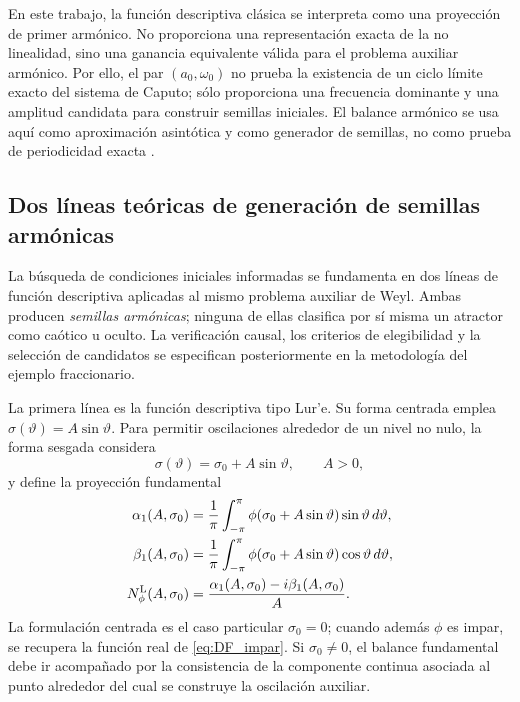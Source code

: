 \documentclass[journal]{IEEEtran}
\begin{document}
En este trabajo, la función descriptiva clásica se interpreta como una
proyección de primer armónico. No proporciona una representación exacta de
la no linealidad, sino una ganancia equivalente válida para el problema
auxiliar armónico. Por ello, el par \((a_0,\omega_0)\) no prueba la
existencia de un ciclo límite exacto del sistema de Caputo; sólo proporciona
una frecuencia dominante y una amplitud candidata para construir semillas
iniciales. El balance armónico se usa aquí como
aproximación asintótica y como generador de semillas, no como prueba de
periodicidad exacta \cite{TavazoeiHaeri2009,KaslikSivasundaram2012,Vigue2019,Haacker2026}.

\subsection{Dos líneas teóricas de generación de semillas armónicas}
\label{subsec:dos_lineas_df_teoria}

La búsqueda de condiciones iniciales informadas se fundamenta en dos líneas
de función descriptiva aplicadas al mismo problema auxiliar de Weyl. Ambas
producen \emph{semillas armónicas}; ninguna de ellas clasifica por sí misma
un atractor como caótico u oculto. La verificación causal, los criterios de
elegibilidad y la selección de candidatos se especifican posteriormente en
la metodología del ejemplo fraccionario.

La primera línea es la función descriptiva tipo Lur'e. Su forma centrada
emplea \(\sigma(\vartheta)=A\sin\vartheta\). Para permitir oscilaciones
alrededor de un nivel no nulo, la forma sesgada considera
\begin{equation}
\label{eq:biased_input_theory}
\sigma(\vartheta)=\sigma_0+A\sin\vartheta,
\qquad A>0,
\end{equation}
y define la proyección fundamental
\begin{equation}
\label{eq:biased_df_theory}
\begin{aligned}
\alpha_1(A,\sigma_0)
&=\frac{1}{\pi}\int_{-\pi}^{\pi}
\phi(\sigma_0+A\sin\vartheta)\sin\vartheta\,d\vartheta,\\
\beta_1(A,\sigma_0)
&=\frac{1}{\pi}\int_{-\pi}^{\pi}
\phi(\sigma_0+A\sin\vartheta)\cos\vartheta\,d\vartheta,\\
N_{\phi}^{\rm L}(A,\sigma_0)
&=\frac{\alpha_1(A,\sigma_0)-i\beta_1(A,\sigma_0)}{A}.
\end{aligned}
\end{equation}
La formulación centrada es el caso particular \(\sigma_0=0\); cuando además
\(\phi\) es impar, se recupera la función real de
\eqref{eq:DF_impar}. Si \(\sigma_0\neq0\), el balance fundamental debe ir
acompañado por la consistencia de la componente continua asociada al punto
alrededor del cual se construye la oscilación auxiliar.
\end{document}
